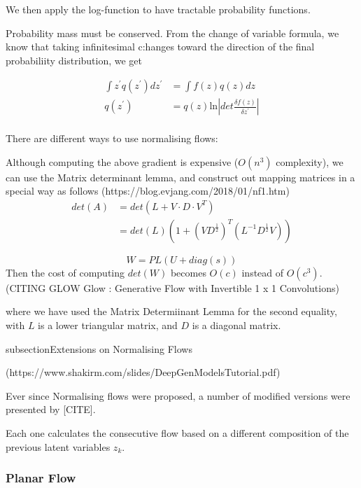 \documentclass[a4paper,12pt,twoside,openright]{report}
\begin{document}
We then apply the log-function to have tractable probability functions.

Probability mass must be conserved.
From the change of variable formula, we know that taking infinitesimal c:hanges toward the direction of the final probabiliity distribution, we get

\begin{align}
\int z^\prime q(z^\prime) dz^\prime &= \int f(z) q(z) dz \\
q(z^\prime) &= q(z) \text{ln} \left| det \frac{\delta f(z)}{\delta z^\prime} \right|
\end{align} \\

There are different ways to use normalising flows:

Although computing the above gradient is expensive ($O(n^3)$ complexity), we can use the Matrix determinant lemma, and construct out mapping matrices in a special way as follows
(https://blog.evjang.com/2018/01/nf1.htm)\\

\begin{align}
det(A) & = det(L + V \cdot D \cdot V^T) \\
		& = det(L) (1 + (VD^{\frac{1}{2}})^T (L^{-1} D^{\frac{1}{2}}V))
\end{align}

\begin{equation}
W = PL (U + diag(s))
\end{equation}
Then the cost of computing $det(W)$ becomes $O(c)$ instead of $O(c^3)$.
(CITING GLOW Glow : Generative Flow with Invertible 1 x 1 Convolutions)

where we have used the Matrix Determiinant Lemma for the second equality, with $L$ is a lower triangular matrix, and $D$ is a diagonal matrix.


subsection{Extensions on Normalising Flows}

(https://www.shakirm.com/slides/DeepGenModelsTutorial.pdf)

Ever since Normalising flows were proposed, a number of modified versions were presented by [CITE].

Each one calculates the consecutive flow based on a different composition of the previous latent variables $z_k$.

\subsubsection{Planar Flow}
\end{document}
